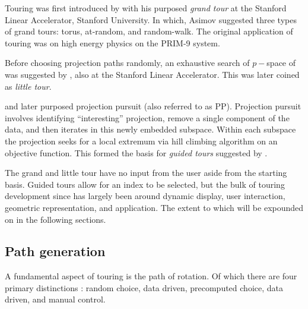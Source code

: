 \documentclass{monashthesis}
\begin{document}
Touring was first introduced by \textcite{asimov_grand_1985} with his
purposed \emph{grand tour} at the Stanford Linear Accelerator, Stanford
University. In which, Asimov suggested three types of grand tours:
torus, at-random, and random-walk. The original application of touring
was on high energy physics on the PRIM-9 system.

Before choosing projection paths randomly, an exhaustive search of
\(p-\)space of was suggested by \textcite{mcdonald_interactive_1982},
also at the Stanford Linear Accelerator. This was later coined as
\emph{little tour}.

\textcite{friedman_projection_1974} and later
\textcite{huber_projection_1985} purposed projection pursuit (also
referred to as PP). Projection pursuit involves identifying
``interesting'' projection, remove a single component of the data, and
then iterates in this newly embedded subspace. Within each subspace the
projection seeks for a local extremum via hill climbing algorithm on an
objective function. This formed the basis for \emph{guided tours}
suggested by \textcite{hurley_analyzing_1990}.

The grand and little tour have no input from the user aside from the
starting basis. Guided tours allow for an index to be selected, but the
bulk of touring development since has largely been around dynamic
display, user interaction, geometric representation, and application.
The extent to which will be expounded on in the following sections.

\subsection{Path generation}\label{path-generation}

A fundamental aspect of touring is the path of rotation. Of which there
are four primary distinctions \autocite{buja_computational_2005}: random
choice, data driven, precomputed choice, data driven, and manual
control.
\end{document}
